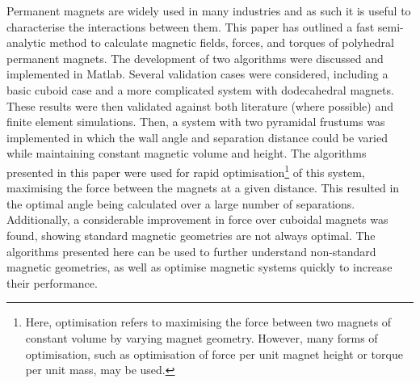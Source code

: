 Permanent magnets are widely used in many industries and as such it is useful to characterise the interactions between them. This paper has outlined a fast semi-analytic method to calculate magnetic fields, forces, and torques of polyhedral permanent magnets. The development of two algorithms were discussed and implemented in Matlab. Several validation cases were considered, including a basic cuboid case and a more complicated system with dodecahedral magnets. These results were then validated against both literature (where possible) and finite element simulations. Then, a system with two pyramidal frustums was implemented in which the wall angle and separation distance could be varied while maintaining constant magnetic volume and height. The algorithms presented in this paper were used for rapid optimisation\footnote{Here, optimisation refers to maximising the force between two magnets of constant volume by varying magnet geometry. However, many forms of optimisation, such as optimisation of force per unit magnet height or torque per unit mass, may be used.} of this system, maximising the force between the magnets at a given distance. This resulted in the optimal angle being calculated over a large number of separations. Additionally, a considerable improvement in force over cuboidal magnets was found, showing standard magnetic geometries are not always optimal. The algorithms presented here can be used to further understand non-standard magnetic geometries, as well as optimise magnetic systems quickly to increase their performance.